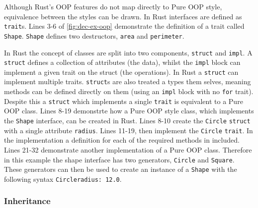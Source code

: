 \documentclass[ oneside,%
                    author={James Elgar},
                    degree={MEng},
                     title={Bidirectional transformer between functional and \\ object-oriented programming in Rust},
                  subtitle={}]{dissertation}
\newcommand{\rust}[1]{\texttt{#1}}
\begin{document}
Although Rust's OOP features do not map directly to Pure OOP style, equivalence between the styles can be drawn. In Rust interfaces are defined as \rust{trait}s. Lines 3-6 of \autoref{fig:dec-ex-oop} demonstrate the definition of a trait called \rust{Shape}. \rust{Shape} defines two destructors, \rust{area} and \rust{perimeter}. 

In Rust the concept of classes are split into two components, \rust{struct} and \rust{impl}. A \rust{struct} defines a collection of attributes (the data), whilst the \rust{impl} block can implement a given trait on the struct (the operations). In Rust a \rust{struct} can implement multiple traits. \rust{struct}s are also treated a types them selves, meaning methods can be defined directly on them (using an \rust{impl} block with no \rust{for} trait). Despite this a \rust{struct} which implements a single \rust{trait} is equivalent to a Pure OOP class. 
Lines 8-19 demonstrte how a Pure OOP style class, which implements the \rust{Shape} interface, can be created in Rust. 
Lines 8-10 create the \rust{Circle} \rust{struct} with a single attribute \rust{radius}. Lines 11-19, then implement the \rust{Circle} \rust{trait}. In the implementation a definition for each of the required methods in included. 
Lines 21-32 demonstrate another implementation of a Pure OOP class. Therefore in this example the shape interface has two generators, \rust{Circle} and \rust{Square}. These generators can then be used to create an instance of a \rust{Shape} with the following syntax \rust{Circle{radius: 12.0}}.


\subsubsection{Inheritance}
\end{document}

